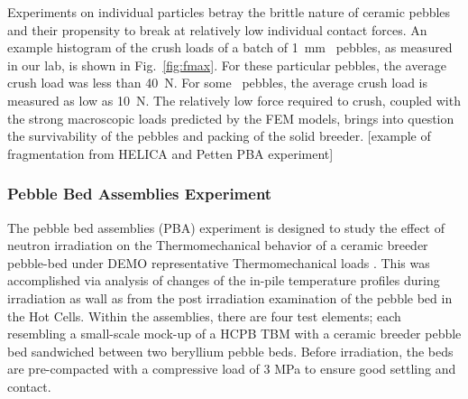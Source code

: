 Experiments on individual particles betray the brittle nature of ceramic pebbles and their propensity to break at relatively low individual contact forces. An example histogram of the crush loads of a batch of 1~mm \lit~pebbles, as measured in our lab, is shown in Fig.~\ref{fig:fmax}. For these particular pebbles, the average crush load was less than \SI{40}{\newton}. For some \lis~pebbles, the average crush load is measured as low as \SI{10}{\newton}. The relatively low force required to crush, coupled with the strong macroscopic loads predicted by the FEM models, brings into question the survivability of the pebbles and packing of the solid breeder. [example of fragmentation from HELICA and Petten PBA experiment]




\subsubsection{Pebble Bed Assemblies Experiment}
The pebble bed assemblies (PBA) experiment is designed to study the effect of neutron irradiation on the Thermomechanical behavior of a ceramic breeder pebble-bed under DEMO representative Thermomechanical loads \cite{Magielsen2007}. This was accomplished via analysis of changes of the in-pile temperature profiles during irradiation as wall as from the post irradiation examination of the pebble bed in the Hot Cells. Within the assemblies, there are four test elements; each resembling a small-scale mock-up of a HCPB TBM with a ceramic breeder pebble bed sandwiched between two beryllium pebble beds. Before irradiation, the beds are pre-compacted with a compressive load of 3 MPa to ensure good settling and contact.  



